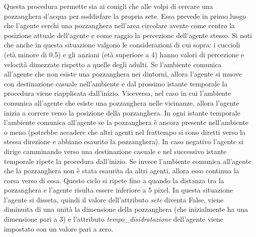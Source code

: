 \documentclass[11pt]{article}
\begin{document}
Questa procedura permette sia ai conigli che alle volpi di cercare una pozzanghera d'acqua per soddisfare la propria sete. Essa prevede in primo luogo che l'agente cerchi una pozzanghera nell'area circolare avente come centro la posizione attuale dell'agente e come raggio la percezione dell'agente stesso. Si noti che anche in questa situazione valgono le considerazioni di cui sopra: i cuccioli (età minore di 0.5) e gli anziani (età superiore a 4) hanno valori di percezione e velocità dimezzate rispetto a quelle degli adulti. Se l'ambiente comunica all'agente che non esiste una pozzanghera nei dintorni, allora l'agente si muove con destinazione casuale nell'ambiente e dal prossimo istante temporale la procedura viene riapplicata dall'inizio. Viceversa, nel caso in cui l'ambiente comunica all'agente che esiste una pozzanghera nelle vicinanze, allora l'agente inizia a correre verso la posizione della pozzanghera. In ogni istante temporale l'ambiente comunica all'agente se la pozzanghera è ancora presente nell'ambiente o meno (potrebbe accadere che altri agenti nel frattempo si sono diretti verso la stessa direzione e abbiano esaurito la pozzanghera). In caso negativo l'agente si dirige camminando verso una destinazione casuale e nel successivo istante temporale ripete la procedura dall'inizio. Se invece l'ambiente comunica all'agente che la pozzanghera non è stata esaurita da altri agenti, allora esso continua la corsa verso di essa. Questo ciclo si ripete fino a quando la distanza tra la pozzanghera e l'agente risulta essere inferiore a 5 pixel. In questa situazione l'agente si disseta, quindi il valore dell'attributo \emph{sete} diventa False, viene diminuita di una unità la dimensione della pozzanghera (che inizialmente ha una dimensione pari a 3) e l'attributo \emph{tempo\_disidratazione} dell'agente viene impostato con un valore pari a zero. 
\end{document}
